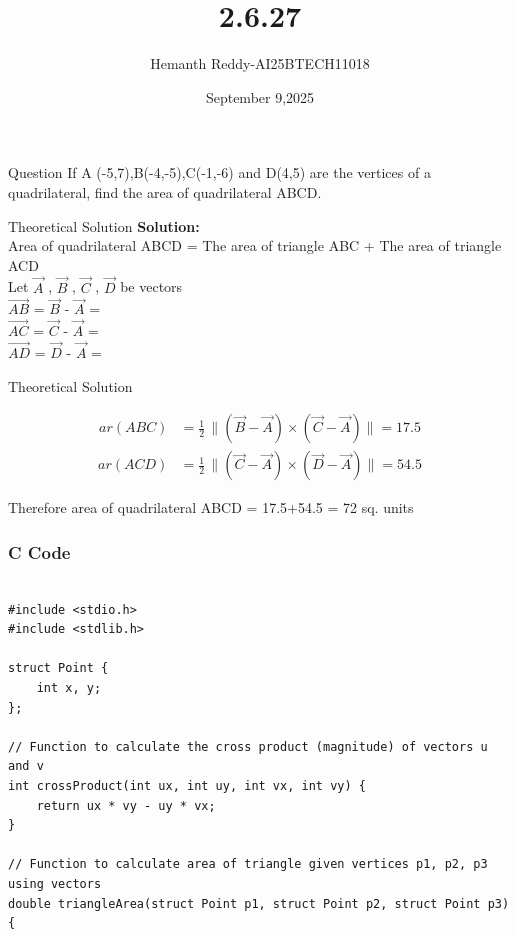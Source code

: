 \documentclass{beamer}
\title %
{2.6.27}
\date{September 9,2025}
\author %
{Hemanth Reddy-AI25BTECH11018}
\begin{document}
\frame{\titlepage}
\begin{frame}{Question}
If A (-5,7),B(-4,-5),C(-1,-6) and D(4,5) are the vertices of a quadrilateral, find
 the area of quadrilateral ABCD.
\end{frame}



\begin{frame}{Theoretical Solution}
\textbf{Solution:}\\
Area of quadrilateral ABCD = The area of triangle ABC + The area of triangle ACD\\Let 
$\vec{A}$ ,
$\vec{B}$ ,
$\vec{C}$ ,
$\vec{D}$ 
be vectors\\

$\overrightarrow{AB}$ =   $\vec{B}$  -  $\vec{A}$  =  \\
\vspace{0.2cm}
$\overrightarrow{AC}$ =  $\vec{C}$  -  $\vec{A}$  =  \\
\vspace{0.2cm}
$\overrightarrow{AD}$ =  $\vec{D}$  -  $\vec{A}$  =  \\




\end{frame}

\begin{frame}{Theoretical Solution}

\begin{align}
ar(ABC) &= \frac{1}{2} \, \|(\vec{B} - \vec{A}) \times (\vec{C} - \vec{A}) \|  =  17.5
\end{align}
\begin{align}
ar(ACD) &= \frac{1}{2} \, \|(\vec{C} - \vec{A}) \times (\vec{D} - \vec{A}) \|  =  54.5
\end{align}

Therefore area of quadrilateral ABCD = 17.5+54.5 = 72 sq. units



\end{frame}


\begin{frame}[fragile]
    \frametitle{C Code }
    \begin{lstlisting}

#include <stdio.h>
#include <stdlib.h>

struct Point {
    int x, y;
};

// Function to calculate the cross product (magnitude) of vectors u and v
int crossProduct(int ux, int uy, int vx, int vy) {
    return ux * vy - uy * vx;
}

// Function to calculate area of triangle given vertices p1, p2, p3 using vectors
double triangleArea(struct Point p1, struct Point p2, struct Point p3) {


    \end{lstlisting}
\end{frame}
\end{document}
